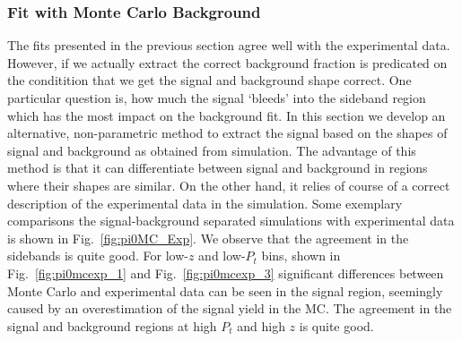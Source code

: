 \subsubsection{Fit with Monte Carlo Background}
\label{sec:fit_with_MC_BG}

The fits presented in the previous section agree well with the experimental data. 
However, if we actually extract the correct background fraction is predicated on the conditition that we get the signal and background shape correct.  One particular question is, how much the signal `bleeds' into the sideband region which has the most impact on the background fit. In this section we  develop an alternative, non-parametric method to extract the signal based on the shapes of signal and background as obtained from simulation. The advantage of this method is that it can differentiate between signal and background in regions where their shapes are similar. On the other hand, it relies of course of a correct description of the experimental data in the simulation.
Some exemplary comparisons the signal-background separated simulations with experimental data is shown in  Fig.~\ref{fig:pi0MC_Exp}. We observe that the agreement in the sidebands is quite good.  For low-$z$ and low-$P_t$ bins,  shown in Fig.~\ref{fig:pi0mcexp_1} and Fig.~\ref{fig:pi0mcexp_3} significant differences between Monte Carlo and experimental data can be seen in the signal region, seemingly caused by an overestimation of the signal yield in the MC. The agreement in the signal and background regions at high $P_t$ and high $z$ is quite good. 
